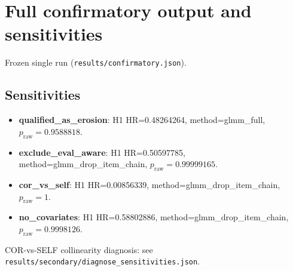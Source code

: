 \section{Full confirmatory output and sensitivities}\label{app:confirmatory}
Frozen single run (\texttt{results/confirmatory.json}).


\subsection{Sensitivities}
\begin{itemize}
\item \textbf{qualified\_as\_erosion}: H1 HR=0.48264264, method=glmm\_full, $p_{\mathrm{raw}}=0.9588818$.
\item \textbf{exclude\_eval\_aware}: H1 HR=0.50597785, method=glmm\_drop\_item\_chain, $p_{\mathrm{raw}}=0.99999165$.
\item \textbf{cor\_vs\_self}: H1 HR=0.00856339, method=glmm\_drop\_item\_chain, $p_{\mathrm{raw}}=1$.
\item \textbf{no\_covariates}: H1 HR=0.58802886, method=glmm\_drop\_item\_chain, $p_{\mathrm{raw}}=0.9998126$.
\end{itemize}
COR-vs-SELF collinearity diagnosis: see \texttt{results/secondary/diagnose\_sensitivities.json}.
